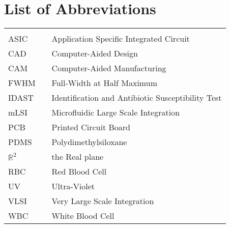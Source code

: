 \chapter*{List of Abbreviations}
\begin{center}
  \begin{tabular}{lll}
    \hspace*{2em} & \hspace*{1in} & \hspace*{4.5in} \\
    ASIC & \dotfill & Application Specific Integrated Circuit \\
    CAD  & \dotfill & Computer-Aided Design \\
    CAM  & \dotfill & Computer-Aided Manufacturing \\
    FWHM & \dotfill & Full-Width at Half Maximum \\
    IDAST &\dotfill & Identification and Antibiotic Susceptibility Test\\
    mLSI & \dotfill & Microfluidic Large Scale Integration \\
    PCB  & \dotfill & Printed Circuit Board \\
    PDMS & \dotfill & Polydimethylsiloxane \\
    $\mathbb{R}^{2}$  & \dotfill & the Real plane \\
    RBC  & \dotfill & Red Blood Cell \\
    UV	 & \dotfill & Ultra-Violet \\
    VLSI & \dotfill & Very Large Scale Integration \\
    WBC  & \dotfill & White Blood Cell \\
  \end{tabular}
\end{center}
\cleardoublepage


\newpage
\endofprelim
